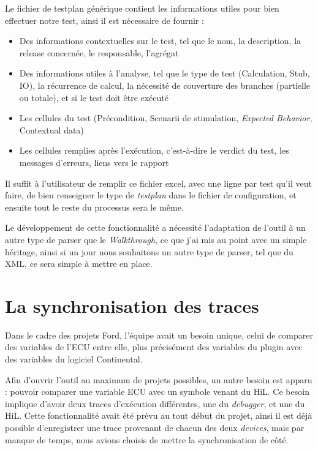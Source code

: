 Le fichier de testplan générique contient les informations utiles pour bien effectuer notre test, ainsi il est nécessaire de fournir : 
\begin{itemize}
	\item Des informations contextuelles sur le test, tel que le nom, la description, la release concernée, le responsable, l'agrégat
	\item Des informations utiles à l'analyse, tel que le type de test (Calculation, Stub, IO), la récurrence de calcul, la nécessité de couverture des branches (partielle ou totale), et si le test doit être exécuté
	\item Les cellules du test (Précondition, Scenarii de stimulation, \textit{Expected Behavior}, Contextual data)
	\item Les cellules remplies après l'exécution, c'est-à-dire le verdict du test, les messages d'erreurs, liens vers le rapport
\end{itemize}

Il suffit à l'utilisateur de remplir ce fichier excel, avec une ligne par test qu'il veut faire, de bien renseigner le type de \textit{testplan} dans le fichier de configuration, et ensuite tout le reste du processus sera le même.

Le développement de cette fonctionnalité a nécessité l'adaptation de l'outil à un autre type de parser que le \textit{Walkthrough}, ce que j'ai mis au point avec un simple héritage, ainsi si un jour nous souhaitons un autre type de parser, tel que du XML, ce sera simple à mettre en place. 

\section{La synchronisation des traces}\label{synchro}	
Dans le cadre des projets Ford, l'équipe avait un besoin unique, celui de comparer des variables de l'ECU entre elle, plus précisément des variables du plugin avec des variables du logiciel Continental.

Afin d'ouvrir l'outil au maximum de projets possibles, un autre besoin est apparu : pouvoir comparer une variable ECU avec un symbole venant du HiL. Ce besoin implique d'avoir deux traces d'exécution différentes, une du \textit{debugger}, et une du HiL. Cette fonctionnalité avait été prévu au tout début du projet, ainsi il est déjà possible d'enregistrer une trace provenant de chacun des deux \textit{devices}, mais par manque de temps, nous avions choisis de mettre la synchronisation de côté.

